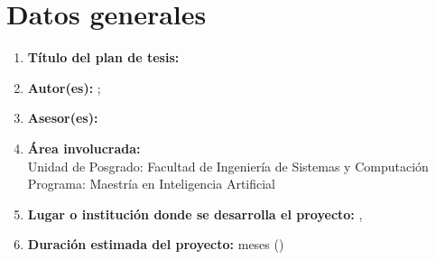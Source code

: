 \chapter*{Datos generales}

\begin{enumerate}
  \item \textbf{Título del plan de tesis:} \tituloPlan
  \item \textbf{Autor(es):} \autorAlex; \autorJack
  \item \textbf{Asesor(es):} \asesorPlan
  \item \textbf{Área involucrada:} \areaTematica\\
        Unidad de Posgrado: Facultad de Ingeniería de Sistemas y Computación\\
        Programa: Maestría en Inteligencia Artificial
  \item \textbf{Lugar o institución donde se desarrolla el proyecto:} \institucionDesarrollo, \ciudad
  \item \textbf{Duración estimada del proyecto:} \duracionMeses{} meses (\duracionFechas)
\end{enumerate}
